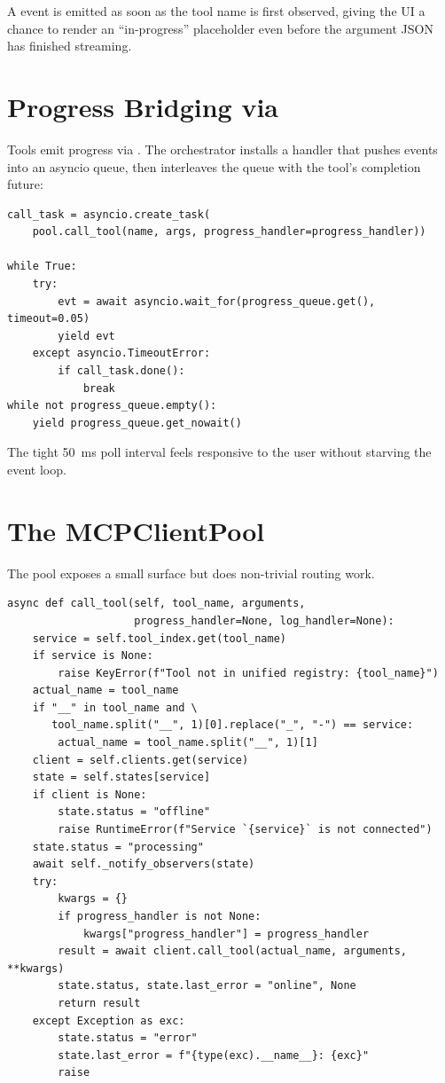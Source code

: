 A  event is emitted as soon as the tool name is
first observed, giving the UI a chance to render an ``in-progress''
placeholder even before the argument JSON has finished streaming.

\section{Progress Bridging via }
\label{sec:queue-bridge}

Tools emit progress via . The orchestrator installs a handler that pushes
 events into an asyncio queue, then interleaves
the queue with the tool's completion future:

\begin{lstlisting}[caption={Interleaving tool execution and progress
events.}, label={lst:queue}]
call_task = asyncio.create_task(
    pool.call_tool(name, args, progress_handler=progress_handler))

while True:
    try:
        evt = await asyncio.wait_for(progress_queue.get(), timeout=0.05)
        yield evt
    except asyncio.TimeoutError:
        if call_task.done():
            break
while not progress_queue.empty():
    yield progress_queue.get_nowait()
\end{lstlisting}

The tight 50~ms poll interval feels responsive to the user without
starving the event loop.

\section{The MCPClientPool}
\label{sec:pool-impl}

The pool exposes a small surface but does non-trivial routing work.

\begin{lstlisting}[caption={\code{MCPClientPool.call\_tool} (extract).},
label={lst:call-tool}]
async def call_tool(self, tool_name, arguments,
                    progress_handler=None, log_handler=None):
    service = self.tool_index.get(tool_name)
    if service is None:
        raise KeyError(f"Tool not in unified registry: {tool_name}")
    actual_name = tool_name
    if "__" in tool_name and \
       tool_name.split("__", 1)[0].replace("_", "-") == service:
        actual_name = tool_name.split("__", 1)[1]
    client = self.clients.get(service)
    state = self.states[service]
    if client is None:
        state.status = "offline"
        raise RuntimeError(f"Service `{service}` is not connected")
    state.status = "processing"
    await self._notify_observers(state)
    try:
        kwargs = {}
        if progress_handler is not None:
            kwargs["progress_handler"] = progress_handler
        result = await client.call_tool(actual_name, arguments, **kwargs)
        state.status, state.last_error = "online", None
        return result
    except Exception as exc:
        state.status = "error"
        state.last_error = f"{type(exc).__name__}: {exc}"
        raise
\end{lstlisting}

